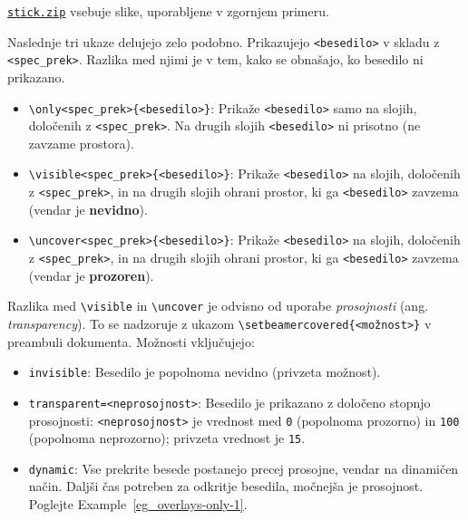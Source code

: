 \begin{example}\label{eg_beamer-overlay-3}\end{example}\href{/stick-3a960172ac01f90300a20c6f2227b668.zip}{\texttt{stick.zip}} vsebuje slike, uporabljene v zgornjem primeru.

Naslednje tri ukaze delujejo zelo podobno. Prikazujejo \texttt{\textless besedilo\textgreater } v skladu z \texttt{\textless spec\_prek\textgreater }. Razlika med njimi je v tem, kako se obnašajo, ko besedilo ni prikazano.

\begin{itemize}
\item \texttt{{\textbackslash}only\textless spec\_prek\textgreater \{\textless besedilo\textgreater \}}: Prikaže \texttt{\textless besedilo\textgreater } samo na slojih, določenih z \texttt{\textless spec\_prek\textgreater }. Na drugih slojih \texttt{\textless besedilo\textgreater } ni prisotno (ne zavzame prostora).
\item \texttt{{\textbackslash}visible\textless spec\_prek\textgreater \{\textless besedilo\textgreater \}}: Prikaže \texttt{\textless besedilo\textgreater } na slojih, določenih z \texttt{\textless spec\_prek\textgreater }, in na drugih slojih ohrani prostor, ki ga \texttt{\textless besedilo\textgreater } zavzema (vendar je \textbf{nevidno}).
\item \texttt{{\textbackslash}uncover\textless spec\_prek\textgreater \{\textless besedilo\textgreater \}}: Prikaže \texttt{\textless besedilo\textgreater } na slojih, določenih z \texttt{\textless spec\_prek\textgreater }, in na drugih slojih ohrani prostor, ki ga \texttt{\textless besedilo\textgreater } zavzema (vendar je \textbf{prozoren}).
\end{itemize}

Razlika med \texttt{{\textbackslash}visible} in \texttt{{\textbackslash}uncover} je odvisno od uporabe \textit{prosojnosti} (ang. \textit{transparency}). To se nadzoruje z ukazom \texttt{{\textbackslash}setbeamercovered\{\textless možnost\textgreater \}} v preambuli dokumenta. Možnosti vključujejo:

\begin{itemize}
\item \texttt{invisible}: Besedilo je popolnoma nevidno (privzeta možnost).
\item \texttt{transparent=\textless neprosojnost\textgreater }: Besedilo je prikazano z določeno stopnjo prosojnosti: \texttt{\textless neprosojnost\textgreater } je vrednost med \texttt{0} (popolnoma prozorno) in \texttt{100} (popolnoma neprozorno); privzeta vrednost je \texttt{15}.
\item \texttt{dynamic}: Vse prekrite besede postanejo precej prosojne, vendar na dinamičen način. Daljši čas potreben za odkritje besedila, močnejša je prosojnost. Poglejte Example~\ref{eg_overlays-only-1}.
\end{itemize}

